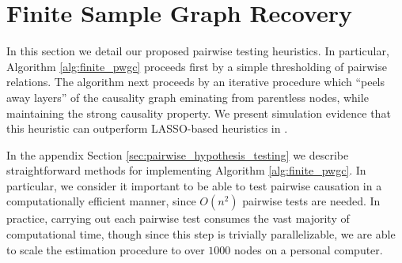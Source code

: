 \documentclass[12pt]{article}
\def\gcg{\mathcal{G}}  %
\begin{document}
\section{Finite Sample Graph Recovery}
\label{sec:structure_learning}
In this section we detail our proposed pairwise testing heuristics.
In particular, Algorithm \ref{alg:finite_pwgc} proceeds first by a
simple thresholding of pairwise relations.  The algorithm next
proceeds by an iterative procedure which ``peels away layers'' of the
causality graph eminating from parentless nodes, while maintaining the
strong causality property.  We present simulation evidence that this
heuristic can outperform LASSO-based heuristics in \cite{my_GC_paper}.

In the appendix Section \ref{sec:pairwise_hypothesis_testing} we describe
straightforward methods for implementing Algorithm
\ref{alg:finite_pwgc}.  In particular, we consider it important to be
able to test pairwise causation in a computationally efficient manner,
since $O(n^2)$ pairwise tests are needed.  In practice, carrying out
each pairwise test consumes the vast majority of computational time,
though since this step is trivially parallelizable, we are able to
scale the estimation procedure to over $1000$ nodes on a personal
computer.
\end{document}
